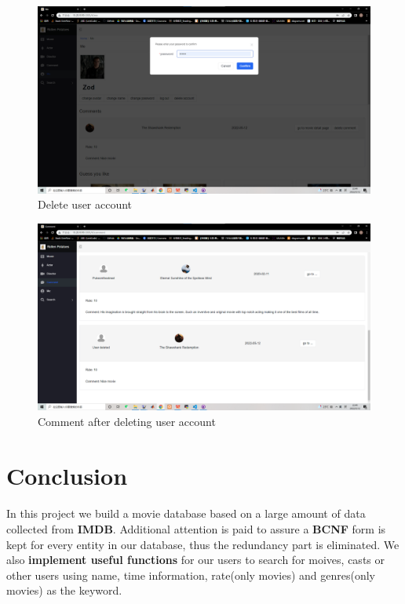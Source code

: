 \begin{CJK*}{UTF8}{gbsn}
\begin{figure}[htbp]
\centering
\includegraphics[width=1\textwidth]{res_delete1.png}
\caption{Delete user account}
\end{figure}

\begin{figure}[htbp]
\centering
\includegraphics[width=1\textwidth]{res_delete2.png}
\caption{Comment after deleting user account}
\end{figure}




\section{Conclusion}
\paragraph{} In this project we build a movie database based on a large amount of data collected from \textbf{IMDB}. Additional attention is paid to assure a \textbf{BCNF} form is kept for every entity in our database, thus the redundancy part is eliminated. We also \textbf{implement useful functions} for our users to search for moives, casts or other users using name,  time information, rate(only movies) and genres(only movies) as the keyword.

\end{CJK*}
